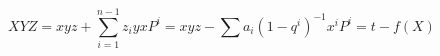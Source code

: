 \begin{equation}
XYZ = xyz+ \sum_{i=1}^{n-1}  z_iy x P^i
= xyz - \sum a_i(1-q^i)^{-1} x^{i} P^i = t - f(X)
\end{equation}

